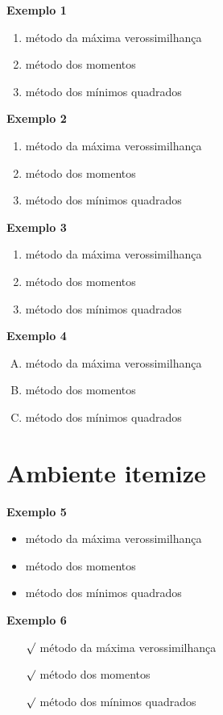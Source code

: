\documentclass[12pt]{article}
\begin{document}
\noindent \textbf{Exemplo 1}

\begin{enumerate}
    \item método da máxima verossimilhança
    \item método dos momentos
    \item método dos mínimos quadrados
\end{enumerate}


\noindent \textbf{Exemplo 2}
\begin{enumerate} [{exemplo} a)]
    \item método da máxima verossimilhança
    \item método dos momentos
    \item método dos mínimos quadrados
\end{enumerate}


\noindent \textbf{Exemplo 3}
\begin{enumerate} [{A-}1)]
    \item método da máxima verossimilhança
    \item método dos momentos
    \item método dos mínimos quadrados
\end{enumerate}


\noindent \textbf{Exemplo 4}
\begin{enumerate} [A.]
    \item método da máxima verossimilhança
    \item método dos momentos
    \item método dos mínimos quadrados
\end{enumerate}


\section{Ambiente itemize}

\noindent \textbf{Exemplo 5}
\begin{itemize}
    \item método da máxima verossimilhança
    \item método dos momentos
    \item método dos mínimos quadrados
\end{itemize}

\noindent \textbf{Exemplo 6}
\begin{itemize}
    \item[$\surd$] método da máxima verossimilhança
    \item[$\surd$] método dos momentos
    \item[$\surd$] método dos mínimos quadrados
\end{itemize}
\end{document}
